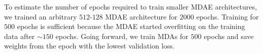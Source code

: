 
To estimate the number of epochs required to train smaller MDAE architectures, we trained an arbitrary $512$-$128$ MDAE architecture for $2000$ epochs.
Training for $500$ epochs is sufficient because the MDAE started overfitting on the training data after $\sim 150$ epochs.
Going forward, we train MDAs for $500$ epochs and save weights from the epoch with the lowest validation loss.




